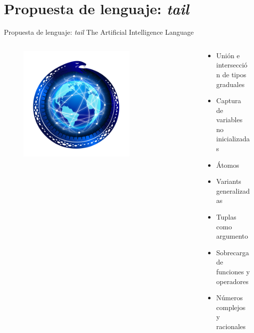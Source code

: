 \documentclass[compress]{beamer}
\begin{document}
\section{Propuesta de lenguaje: \textit{tail}}


\begin{frame}{Propuesta de lenguaje: \textit{tail}}
	{\centering The Artificial Intelligence Language}
	\begin{columns}
		\begin{column}{0.35\paperwidth}
			\begin{figure}[h]
				\begin{center}
					\includegraphics[width=0.7\textwidth]{img/logo.png}
				\end{center}
			\end{figure}
		\end{column}
		\begin{column}{0.65\paperwidth}
			\begin{itemize}
				\item Unión e intersección de tipos graduales\\
				\smallskip
				\smallskip
				\item Captura de variables no inicializadas \\
				\smallskip
				\smallskip
				\item Átomos\\
				\smallskip
				\smallskip
				\item Variants generalizadas\\
				\smallskip
				\smallskip
				\item Tuplas como argumento\\
				\smallskip
				\smallskip
				\item Sobrecarga de funciones y operadores\\
				\smallskip
				\smallskip
				\item Números complejos y racionales\\
			\end{itemize}
		\end{column}
	\end{columns}
\end{frame}
\end{document}
